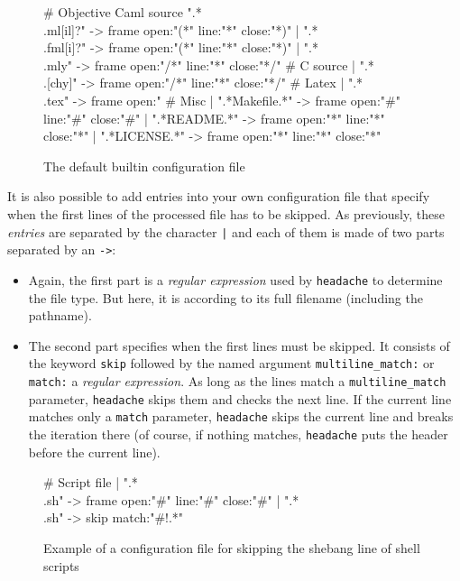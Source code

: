 \documentclass{article}
\newcommand{\mytt}[1]{\texttt{#1}}
\newcommand{\headache}{\mytt{headache}}
\begin{document}
\begin{figure}
\begin{center}
\begin{boxedverbatim}

# Objective Caml source
  ".*\\.ml[il]?" -> frame open:"(*" line:"*" close:"*)"
| ".*\\.fml[i]?" -> frame open:"(*" line:"*" close:"*)"
| ".*\\.mly"     -> frame open:"/*" line:"*" close:"*/"
# C source
| ".*\\.[chy]"    -> frame open:"/*" line:"*" close:"*/"
# Latex
| ".*\\.tex"     -> frame open:"%
# Misc
| ".*Makefile.*" -> frame open:"#"  line:"#" close:"#"
| ".*README.*"   -> frame open:"*"  line:"*" close:"*"
| ".*LICENSE.*"  -> frame open:"*"  line:"*" close:"*"
\end{boxedverbatim}
\end{center}
  \caption{The default builtin configuration file}
  \label{figure:config}
\end{figure}

It is also possible to add entries into your own configuration file that
specify when the first lines of the processed file has to be skipped.
As previously, these \emph{entries} are separated by the character \mytt{|}
and each of them is made of two parts separated by an \mytt{->}:
\begin{itemize}
\item Again, the first part is a \emph{regular expression} used by \headache{}
  to determine the file type. But here, it is according to
  its full filename (including the pathname).
\item The second part specifies when the first lines must be skipped.
  It consists of the keyword \mytt{skip} followed by the named
  argument \mytt{multiline\_match:} or \mytt{match:} a \emph{regular expression}.
  As long as the lines match a \mytt{multiline\_match} parameter,
  \headache{} skips them and checks the next line.
  If the current line matches only a \mytt{match} parameter,
  \headache{} skips the current line and breaks the iteration there (of course,
  if nothing matches, \headache{} puts the header before the current line).

\end{itemize}

\begin{figure}
\begin{center}
\begin{boxedverbatim}
# Script file
 | ".*\\.sh" -> frame open:"#"  line:"#" close:"#"
 | ".*\\.sh" -> skip match:"#!.*"
\end{boxedverbatim}
\end{center}
  \caption{Example of a configuration file for skipping the shebang line of shell scripts}
  \label{figure:example}
\end{figure}
\end{document}
